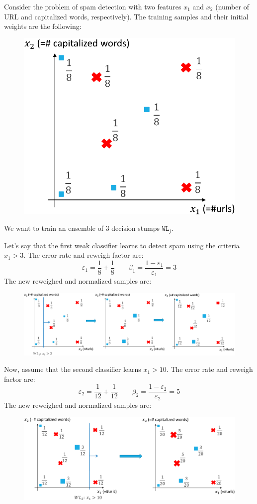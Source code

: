 \begin{description}
        \begin{example}
            \small
            Consider the problem of spam detection with two features $x_1$ and $x_2$ (number of URL and capitalized words, respectively).
            The training samples and their initial weights are the following:
            \begin{figure}[H]
                \centering
                \includegraphics[width=0.3\linewidth]{./img/_adaboost_example1.pdf}
            \end{figure}
            We want to train an ensemble of $3$ decision stumps $\texttt{WL}_{j}$.

            Let's say that the first weak classifier learns to detect spam using the criteria $x_1 > 3$. The error rate and reweigh factor are:
            \[
                \varepsilon_1 = \frac{1}{8} + \frac{1}{8} \qquad
                \beta_1 = \frac{1 - \varepsilon_1}{\varepsilon_1} = 3
            \]
            The new reweighed and normalized samples are:
            \begin{figure}[H]
                \centering
                \includegraphics[width=0.9\linewidth]{./img/_adaboost_example2.pdf}
            \end{figure}

            Now, assume that the second classifier learns $x_1 > 10$. The error rate and reweigh factor are:
            \[ \varepsilon_2 = \frac{1}{12} + \frac{1}{12} \qquad
            \beta_2 = \frac{1 - \varepsilon_2}{\varepsilon_2} = 5 \]
            The new reweighed and normalized samples are:
            \begin{figure}[H]
                \centering
                \includegraphics[width=0.7\linewidth]{./img/_adaboost_example3.pdf}
            \end{figure}


\end{example}
\end{description}
